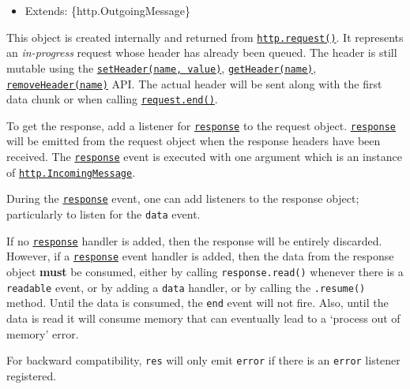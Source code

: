 \begin{itemize}
\tightlist
\item
  Extends: \{http.OutgoingMessage\}
\end{itemize}

This object is created internally and returned from
\hyperref[httprequestoptions-callback]{\texttt{http.request()}}. It
represents an \emph{in-progress} request whose header has already been
queued. The header is still mutable using the
\hyperref[requestsetheadername-value]{\texttt{setHeader(name,\ value)}},
\hyperref[requestgetheadername]{\texttt{getHeader(name)}},
\hyperref[requestremoveheadername]{\texttt{removeHeader(name)}} API. The
actual header will be sent along with the first data chunk or when
calling
\hyperref[requestenddata-encoding-callback]{\texttt{request.end()}}.

To get the response, add a listener for
\hyperref[event-response]{\texttt{\textquotesingle{}response\textquotesingle{}}}
to the request object.
\hyperref[event-response]{\texttt{\textquotesingle{}response\textquotesingle{}}}
will be emitted from the request object when the response headers have
been received. The
\hyperref[event-response]{\texttt{\textquotesingle{}response\textquotesingle{}}}
event is executed with one argument which is an instance of
\hyperref[class-httpincomingmessage]{\texttt{http.IncomingMessage}}.

During the
\hyperref[event-response]{\texttt{\textquotesingle{}response\textquotesingle{}}}
event, one can add listeners to the response object; particularly to
listen for the \texttt{\textquotesingle{}data\textquotesingle{}} event.

If no
\hyperref[event-response]{\texttt{\textquotesingle{}response\textquotesingle{}}}
handler is added, then the response will be entirely discarded. However,
if a
\hyperref[event-response]{\texttt{\textquotesingle{}response\textquotesingle{}}}
event handler is added, then the data from the response object
\textbf{must} be consumed, either by calling \texttt{response.read()}
whenever there is a
\texttt{\textquotesingle{}readable\textquotesingle{}} event, or by
adding a \texttt{\textquotesingle{}data\textquotesingle{}} handler, or
by calling the \texttt{.resume()} method. Until the data is consumed,
the \texttt{\textquotesingle{}end\textquotesingle{}} event will not
fire. Also, until the data is read it will consume memory that can
eventually lead to a `process out of memory' error.

For backward compatibility, \texttt{res} will only emit
\texttt{\textquotesingle{}error\textquotesingle{}} if there is an
\texttt{\textquotesingle{}error\textquotesingle{}} listener registered.

